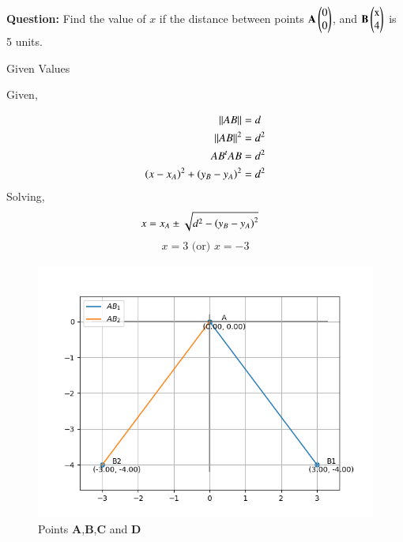 \documentclass[journal]{IEEEtran}
\begin{document}

\vspace{3cm}

\title{}
\author{EE24BTECH11053 - S A Aravind Eswar
}
{\let\newpage\relax\maketitle}

\renewcommand{\thefigure}{\theenumi}
\renewcommand{\thetable}{\theenumi}
\setlength{\intextsep}{10pt} %


\renewcommand{\thetable}{\theenumi}

\textbf{Question:} Find the value of $x$ if the distance between points $\mathbf{A}\begin{pmatrix}0\\0\end{pmatrix}$, and $\vec{B}\myvec{$x$\\4}$ is 5 units.\\

\solution
\begin{table}[h]
	\centering
	
	\caption{Given Values}
	\label{tab:1}
\end{table}

Given,

\begin{align}\left\lVert{AB}\right\rVert &= d\\\left\lVert{AB}\right\rVert^2 &= d^2\\AB^tAB &= d^2\\\left(x-x_A\right)^2 + \left(y_B - y_A\right)^2 &= d^2\end{align}
Solving,\\
\begin{align}x &= x_A \pm \sqrt{d^2 - \left(y_B - y_A\right)^2}\end{align}
	\begin{align}x = 3  \text{ (or) }  x = -3\end{align}

\begin{figure}[h]
    \centering
    \includegraphics[width=\columnwidth]{figs/fig0.png}
    \caption{Points \textbf{A},\textbf{B},\textbf{C} and \textbf{D}}
 \end{figure}
\end{document}
